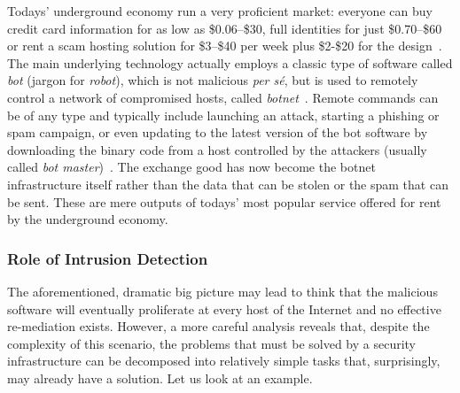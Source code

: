 \documentclass[12pt]{article}
\theoremstyle{definition}
\begin{document}
		Todays' underground economy run a very proficient market: everyone can buy credit card information for as low as \$0.06--\$30, full identities for just \$0.70--\$60 or rent a scam hosting solution for \$3--\$40 per week plus \$2-\$20 for the design~\cite{symantec_threat_report_2017}.\\ 	 

		The main underlying technology actually employs a classic type of software called \emph{bot} (jargon for \emph{robot}), which is not malicious \emph{per s\'e}, but is used to remotely control a network of compromised hosts, called \emph{botnet}~\cite{holz}. Remote commands can be of any type and typically include launching an attack, starting a phishing or spam campaign, or even updating to the latest version of the bot software by downloading the binary code from a host controlled by the attackers (usually called \emph{bot master})~\cite{torpig}. The exchange good has now become the botnet infrastructure itself rather than the data that can be stolen or the spam that can be sent. These are mere outputs of todays' most popular service offered for rent by the underground economy.
		
		\subsubsection{Role of Intrusion Detection}
		
		The aforementioned, dramatic big picture may lead to think that the malicious software will eventually proliferate at every host of the Internet and no effective re-mediation exists. However, a more careful analysis reveals that, despite the complexity of this scenario, the problems that must be solved by a security infrastructure can be decomposed into relatively simple tasks that, surprisingly, may already have a solution. Let us look at an example.
			
\end{document}
